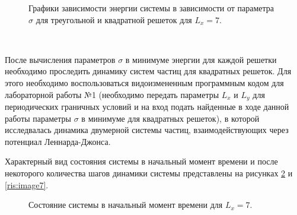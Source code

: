 \documentclass[14pt,a4paper,report]{ncc}
\begin{document}
  \begin{figure}[]
\caption{Графики зависимости энергии системы в зависимости от параметра $\sigma$ для треугольной и квадратной решеток для $L_x=7$.}
\label{ris:image5}
\end{figure}
\

После вычисления параметров $\sigma$ в минимуме энергии для каждой решетки необходимо проследить динамику систем частиц для квадратных решеток. Для этого необходимо воспользоваться видоизмененным программным кодом для лабораторной работы №1 (необходимо передать параметры $L_x$ и $L_y$ для периодических граничных условий и на вход подать найденные в ходе данной работы параметры $\sigma$ в минимуме для квадратных решеток), в которой исследвалась динамика двумерной системы частиц, взаимодействующих через потенциал Леннарда-Джонса.
\

Характерный вид состояния системы в начальный момент времени и после некоторого количества шагов динамики системы представлены на рисунках \ref{ris:image6} и \ref{ris:image7}. 
\
\begin{figure}[]
\caption{Состояние системы в начальный момент времени для $L_x=7$.}
\label{ris:image6}
\end{figure}
\
\end{document}
